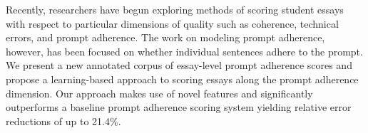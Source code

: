 Recently, researchers have begun exploring methods of scoring student essays with respect to particular dimensions of quality such as coherence, technical errors, and prompt adherence. The work on modeling prompt adherence, however, has been focused on whether individual sentences adhere to the prompt. We present a new annotated corpus of essay-level prompt adherence scores and propose a learning-based approach to scoring essays along the prompt adherence dimension. Our approach makes use of novel features and significantly outperforms a baseline prompt adherence scoring system yielding relative error reductions of up to 21.4\%.

